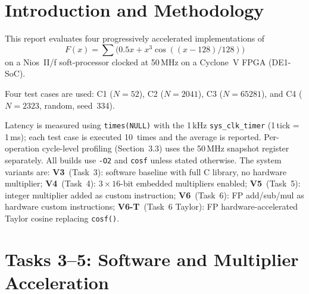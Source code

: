 \documentclass[a4paper,10pt,twocolumn]{article}
\begin{document}

\section{Introduction and Methodology}

This report evaluates four progressively accelerated implementations of
\[
F(x)=\sum\bigl(0.5x + x^{3}\cos((x\!-\!128)/128)\bigr)
\]
on a Nios~II/f soft-processor clocked at 50\,MHz on a Cyclone~V FPGA (DE1-SoC).

Four test cases are used: C1 ($N\!=\!52$), C2 ($N\!=\!2041$), C3 ($N\!=\!65281$), and C4 ($N\!=\!2323$, random, seed~334).

Latency is measured using \texttt{times(NULL)} with the 1\,kHz \texttt{sys\_clk\_timer} (1\,tick = 1\,ms); each test case is executed 10~times and the average is reported.
Per-operation cycle-level profiling (Section~3.3) uses the 50\,MHz snapshot register separately.
All builds use \texttt{-O2} and \texttt{cosf} unless stated otherwise.
The system variants are:
\textbf{V3}~(Task~3): software baseline with full C library, no hardware multiplier;
\textbf{V4}~(Task~4): $3\!\times\!16$-bit embedded multipliers enabled;
\textbf{V5}~(Task~5): integer multiplier added as custom instruction;
\textbf{V6}~(Task~6): FP add/sub/mul as hardware custom instructions;
\textbf{V6-T}~(Task~6 Taylor): FP hardware-accelerated Taylor cosine replacing \texttt{cosf()}.

\section{Tasks 3--5: Software and Multiplier Acceleration}
\end{document}
